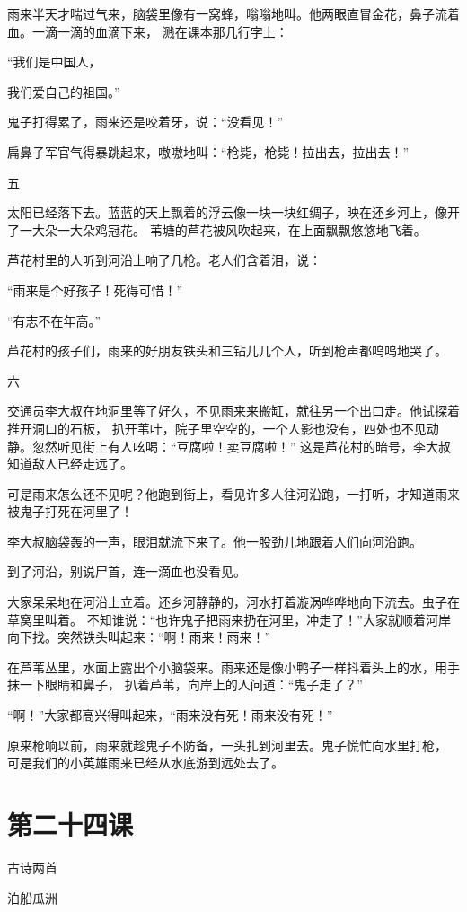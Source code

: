 \documentclass[12pt,UTF8]{ctexbook}
\begin{document}
雨来半天才喘过气来，脑袋里像有一窝蜂，嗡嗡地叫。他两眼直冒金花，鼻子流着血。一滴一滴的血滴下来，
溅在课本那几行字上：

“我们是中国人，

我们爱自己的祖国。”

鬼子打得累了，雨来还是咬着牙，说：“没看见！”

扁鼻子军官气得暴跳起来，嗷嗷地叫：“枪毙，枪毙！拉出去，拉出去！”

五

太阳已经落下去。蓝蓝的天上飘着的浮云像一块一块红绸子，映在还乡河上，像开了一大朵一大朵鸡冠花。
苇塘的芦花被风吹起来，在上面飘飘悠悠地飞着。

芦花村里的人听到河沿上响了几枪。老人们含着泪，说：

“雨来是个好孩子！死得可惜！”

“有志不在年高。”

芦花村的孩子们，雨来的好朋友铁头和三钻儿几个人，听到枪声都呜呜地哭了。

六

交通员李大叔在地洞里等了好久，不见雨来来搬缸，就往另一个出口走。他试探着推开洞口的石板，
扒开苇叶，院子里空空的，一个人影也没有，四处也不见动静。忽然听见街上有人吆喝：“豆腐啦！卖豆腐啦！”
这是芦花村的暗号，李大叔知道敌人已经走远了。

可是雨来怎么还不见呢？他跑到街上，看见许多人往河沿跑，一打听，才知道雨来被鬼子打死在河里了！

李大叔脑袋轰的一声，眼泪就流下来了。他一股劲儿地跟着人们向河沿跑。

到了河沿，别说尸首，连一滴血也没看见。

大家呆呆地在河沿上立着。还乡河静静的，河水打着漩涡哗哗地向下流去。虫子在草窝里叫着。
不知谁说：“也许鬼子把雨来扔在河里，冲走了！”大家就顺着河岸向下找。突然铁头叫起来：“啊！雨来！雨来！”

在芦苇丛里，水面上露出个小脑袋来。雨来还是像小鸭子一样抖着头上的水，用手抹一下眼睛和鼻子，
扒着芦苇，向岸上的人问道：“鬼子走了？”

“啊！”大家都高兴得叫起来，“雨来没有死！雨来没有死！”

原来枪响以前，雨来就趁鬼子不防备，一头扎到河里去。鬼子慌忙向水里打枪，
可是我们的小英雄雨来已经从水底游到远处去了。

\section{第二十四课}

古诗两首

泊船瓜洲
\end{document}
